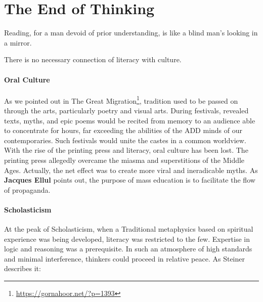 \section{The End of Thinking}

\begin{quotex}
Reading, for a man devoid of prior understanding, is like a blind man's looking in a mirror.
\end{quotex}


\begin{quotex}
There is no necessary connection of literacy with culture.
\end{quotex}


\paragraph{Oral Culture}


As we pointed out in The Great Migration\footnote{\url{https://gornahoor.net/?p=1393}}, tradition used to be passed on through the arts, particularly poetry and visual arts. During festivals, revealed texts, myths, and epic poems would be recited from memory to an audience able to concentrate for hours, far exceeding the abilities of the ADD minds of our contemporaries. Such festivals would unite the castes in a common worldview. With the rise of the printing press and literacy, oral culture has been lost. The printing press allegedly overcame the miasma and superstitions of the Middle Ages. Actually, the net effect was to create more viral and ineradicable myths. As \textbf{Jacques Ellul} points out, the purpose of mass education is to facilitate the flow of propaganda.

\paragraph{Scholasticism}


At the peak of Scholasticism, when a Traditional metaphysics based on spiritual experience was being developed, literacy was restricted to the few. Expertise in logic and reasoning was a prerequisite. In such an atmosphere of high standards and minimal interference, thinkers could proceed in relative peace. As Steiner describes it:


